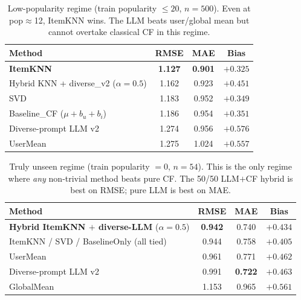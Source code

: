 \documentclass[11pt,a4paper]{article}
\newcommand{\best}[1]{\textcolor{goodgreen}{\textbf{#1}}}
\begin{document}
\begin{table}[H]
\centering
\small
\caption{Low-popularity regime (train popularity $\leq 20$, $n{=}500$).
Even at pop$\approx$12, ItemKNN wins. The LLM beats user/global mean but
cannot overtake classical CF in this regime.}
\label{tab:cold20}
\begin{tabular}{lccc}
\toprule
Method & RMSE & MAE & Bias \\ \midrule
\textbf{ItemKNN}                                   & \best{1.127} & \best{0.901} & $+0.325$ \\
Hybrid KNN + diverse\_v2 ($\alpha{=}0.5$)          & 1.162        & 0.923        & $+0.451$ \\
SVD                                                & 1.183        & 0.952        & $+0.349$ \\
Baseline\_CF ($\mu{+}b_u{+}b_i$)                   & 1.186        & 0.954        & $+0.351$ \\
Diverse-prompt LLM v2                              & 1.274        & 0.956        & $+0.576$ \\
UserMean                                           & 1.275        & 1.024        & $+0.557$ \\
\bottomrule
\end{tabular}
\end{table}

\begin{table}[H]
\centering
\small
\caption{Truly unseen regime (train popularity $=0$, $n{=}54$). This is
the only regime where \emph{any} non-trivial method beats pure CF. The
50/50 LLM$+$CF hybrid is best on RMSE; pure LLM is best on MAE.}
\label{tab:cold0}
\begin{tabular}{lccc}
\toprule
Method & RMSE & MAE & Bias \\ \midrule
\textbf{Hybrid ItemKNN $+$ diverse-LLM} ($\alpha{=}0.5$) & \best{0.942} & 0.740 & $+0.434$ \\
ItemKNN / SVD / BaselineOnly (all tied)                   & 0.944        & 0.758 & $+0.405$ \\
UserMean                                                    & 0.961        & 0.771 & $+0.462$ \\
Diverse-prompt LLM v2                                      & 0.991        & \best{0.722} & $+0.463$ \\
GlobalMean                                                  & 1.153        & 0.965 & $+0.561$ \\
\bottomrule
\end{tabular}
\end{table}
\end{document}
